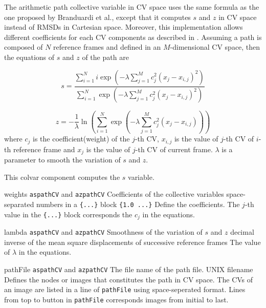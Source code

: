 
The arithmetic path collective variable in CV space uses the same formula as the one proposed by Branduardi\cite{Branduardi2007} et al., except that it computes $s$ and $z$ in CV space instead of RMSDs in Cartesian space. Moreover, this implementation allows different coefficients for each CV components as described in \cite{Hovan2019}. Assuming a path is composed of $N$ reference frames and defined in an $M$-dimensional CV space, then the equations of $s$ and $z$ of the path are

\begin{equation}
s = \frac{\sum_{i=1}^{N} i \exp\left(-\lambda\sum_{j=1}^{M} c_j^2 \left(x_j-x_{i,j}\right)^2\right)}{\sum_{i=1}^{N} \exp\left(-\lambda\sum_{j=1}^{M} c_j^2 \left(x_j-x_{i,j}\right)^2\right)}
\label{eq:apath_s}
\end{equation}

\begin{equation}
z = -\frac{1}{\lambda} \ln \left(\sum_{i=1}^{N} \exp\left(-\lambda\sum_{j=1}^{M} c_j^2 \left(x_j-x_{i,j}\right) \right)\right)
\label{eq:apath_z}
\end{equation}
where $c_j$ is the coefficient(weight) of the $j$-th CV, $x_{i,j}$ is the value of $j$-th CV of $i$-th reference frame and $x_{j}$ is the value of $j$-th CV of current frame. $\lambda$ is a parameter to smooth the variation of $s$ and $z$.


This colvar component computes the $s$ variable.


\begin{cvcoptions}
\item %
  \keydef
    {weights}{%
    \texttt{aspathCV} and \texttt{azpathCV}}{%
    Coefficients of the collective variables}{%
    space-separated numbers in a \texttt{\{...\}} block}{%
    \texttt{\{1.0 ...\}}}{%
    Define the coefficients. The $j$-th value in the \texttt{\{...\}} block corresponds the $c_{j}$ in the equations.
  }

\item %
  \keydef
    {lambda}{%
    \texttt{aspathCV} and \texttt{azpathCV}}{%
    Smoothness of the variation of $s$ and $z$}{%
    decimal}{%
    inverse of the mean square displacements of successive reference frames}{%
    The value of $\lambda$ in the equations.
  }

\item %
  \key
    {pathFile}{%
    \texttt{aspathCV} and \texttt{azpathCV}}{%
    The file name of the path file.}{%
    UNIX filename}{%
		Defines the nodes or images that constitutes the path in CV space. The CVs of an image are listed in a line of \texttt{pathFile} using space-seperated format. Lines from top to button in \texttt{pathFile} corresponds images from initial to last.
    }

\end{cvcoptions}

